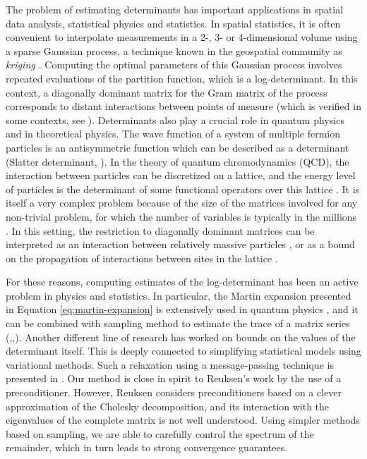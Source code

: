 The problem of estimating determinants has important applications
in spatial data analysis, statistical physics and statistics. In spatial
statistics, it is often convenient to interpolate measurements in
a 2-, 3- or 4-dimensional volume using a sparse Gaussian process,
a technique known in the geospatial community as \emph{kriging }\cite{zhang2010kriging,li2005analysis}\emph{.
}Computing the optimal parameters of this Gaussian process involves
repeated evaluations of the partition function, which is a log-determinant.
In this context, a diagonally dominant matrix for the Gram matrix
of the process corresponds to distant interactions between points
of measure (which is verified in some contexts, see \cite{KelleyPace1997291}).
Determinants also play a crucial role in quantum physics and in theoretical
physics. The wave function of a system of multiple fermion particles
is an antisymmetric function which can be described as a determinant
(Slatter determinant, \cite{atkins2011molecular,lowdin1955quantum}).
In the theory of quantum chromodynamics (QCD), the interaction between
particles can be discretized on a lattice, and the energy level of
particles is the determinant of some functional operators over this
lattice \cite{duncan1998efficient}. It is itself a very complex problem
because of the size of the matrices involved for any non-trivial problem,
for which the number of variables is typically in the millions \cite{bernardson1994monte}.
In this setting, the restriction to diagonally dominant matrices can
be interpreted as an interaction between relatively massive particles
\cite{deForcrand1989516}, or as a bound on the propagation of interactions
between sites in the lattice \cite{bernardson1994monte}.

For these reasons, computing estimates of the log-determinant has
been an active problem in physics and statistics. In particular, the
Martin expansion presented in Equation \eqref{eq:martin-expansion}
is extensively used in quantum physics \cite{Ipsen2006}, and it can
be combined with sampling method to estimate the trace of a matrix
series (\cite{Zhang2008},\cite{McCourt2008},\cite{Zhang2007}).
Another different line of research has worked on bounds on the values
of the determinant itself. This is deeply connected to simplifying
statistical models using variational methods. Such a relaxation using
a message-passing technique is presented in \cite{Wainwright2006}.
Our method is close in spirit to Reuksen's work \cite{Reusken2002}
by the use of a preconditioner. However, Reuksen considers preconditioners
based on a clever approximation of the Cholesky decomposition, and
its interaction with the eigenvalues of the complete matrix is not
well understood. Using simpler methods based on sampling, we are able
to carefully control the spectrum of the remainder, which in turn
leads to strong convergence guarantees.


